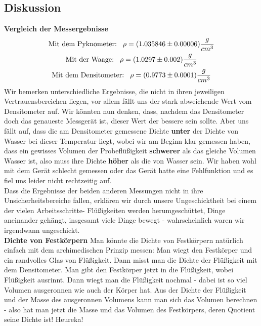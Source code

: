 \documentclass{article}
\begin{document}
\subsection{Diskussion}
\textbf{Vergleich der Messergebnisse}
\begin{gather}
\text{Mit dem Pyknometer:}\hspace{0.3cm} \rho=(1.035846  \pm 0.00006 )\frac{g}{cm^3}\\
\text{Mit der Waage:}\hspace{0.3cm} \rho=(1.0297 \pm 0.002) \frac{g}{cm^3} \\
\text{Mit dem Densitometer:}\hspace{0.3cm} \rho=(0.9773 \pm 0.0001 )\frac{g}{cm^3}
\end{gather}
Wir bemerken unterschiedliche Ergebnisse, die nicht in ihren jeweiligen Vertrauensbereichen liegen, vor allem fällt uns der stark abweichende Wert vom Densitometer auf. Wir könnten nun denken, dass, nachdem das Densitometer doch das genaueste Messgerät ist, dieser Wert der bessere sein sollte. Aber uns fällt auf, dass die am Densitometer gemessene Dichte \textbf{unter} der Dichte von Wasser bei dieser Temperatur liegt, wobei wir am Beginn klar gemessen haben, dass ein gewisses Volumen der Probeflüßigkeit \textbf{schwerer} als das gleiche Volumen Wasser ist, also muss ihre Dichte \textbf{höher} als die von Wasser sein. Wir haben wohl mit dem Gerät schlecht gemessen oder das Gerät hatte eine Fehlfunktion und es fiel uns leider nicht rechtzeitig auf. \\
Dass die Ergebnisse der beiden anderen Messungen nicht in ihre Unsicherheitsbereiche fallen, erklären wir durch unsere Ungeschicktheit bei einem der vielen Arbeitsschritte- Flüßigkeiten werden herumgeschüttet, Dinge aneinander gehängt, insgesamt viele Dinge bewegt - wahrscheinlich waren wir irgendwann ungeschickt. \\
\textbf{Dichte von Festkörpern}
Man könnte die Dichte von Festkörpern natürlich einfach mit dem archimedischen Prinzip messen: Man wiegt den Festkörper und ein randvolles Glas von Flüßigkeit. Dann misst man die Dichte der Flüßigkeit mit dem Densitometer. Man gibt den Festkörper jetzt in die Flüßigkeit, wobei Flüßigkeit ausrinnt. Dann wiegt man die Flüßigkeit nochmal - dabei ist so viel Volumen ausgeronnen wie auch der Körper hat. Aus der Dichte der Flüßigkeit und der Masse des ausgeronnen Volumens kann man sich das Volumen berechnen - also hat man jetzt die Masse und das Volumen des Festkörpers, deren Quotient seine Dichte ist! Heureka!
\newpage
\end{document}
